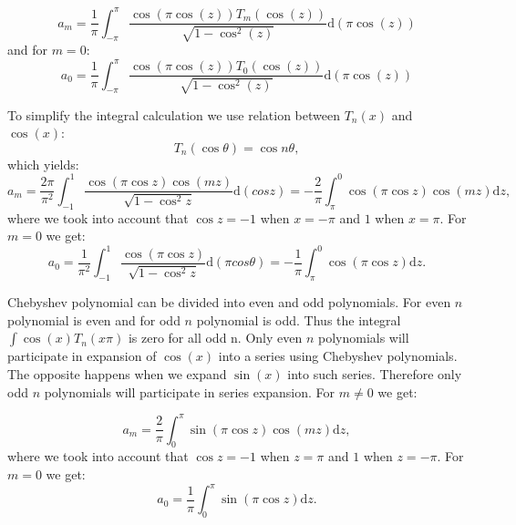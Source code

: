 \documentclass[openany, longbibliography,slovene,a4paper,12pt]{article}
\newcommand{\dif}{\mathrm{d}}
\begin{document}
\begin{equation} \label{coeffm}
a_m= \frac{1}{\pi}\int_{-\pi}^{\pi}\frac{\cos(\pi\cos(z))T_m(\cos(z))}{\sqrt{1-\cos^2(z)}} \dif(\pi\cos(z)) 
\end{equation}
and for $m=0$:
\begin{equation}\label{coeff0}
  a_0=\frac{1}{\pi}\int_{-\pi}^{\pi}\frac{\cos(\pi\cos(z))T_0(\cos(z))}{\sqrt{1-\cos^2(z)}} \dif(\pi\cos(z))
\end{equation}

To simplify the integral calculation we use relation between $T_n(x)$ and $\cos(x)$:
\begin{equation}
  T_n(\cos\theta)=\cos n\theta,
\end{equation}
which yields:
\begin{equation}
  a_m = \frac{2\pi}{\pi^2} \int_{-1}^{1}\frac{\cos(\pi\cos z)\cos(mz)}{\sqrt{1-\cos^2z}} \dif ( cosz)=-\frac{2}{\pi} \int_{\pi}^{0}\cos(\pi\cos z)\cos(mz) \dif z, 
  \end{equation}
where we took into account that $\cos z = -1$ when $x=-\pi$ and $1$ when $x=\pi$.
  For $m=0$ we get:
  \begin{equation}
    a_0 = \frac{1}{\pi^2} \int_{-1}^{1}\frac{\cos(\pi\cos z)}{\sqrt{1-\cos^2z}} \dif (\pi cos\theta)=-\frac{1}{\pi} \int_{\pi}^{0}\cos(\pi\cos z) \dif z.
  \end{equation}

  Chebyshev polynomial can be divided into even and odd polynomials. For even
  $n$ polynomial is even and for odd $n$ polynomial is odd. Thus the integral
  $\int \cos(x) T_n(x\pi)$ is zero for all odd n. Only even $n$ polynomials
  will participate in expansion of $\cos(x)$ into a series using Chebyshev
  polynomials.
  The opposite happens when we expand $\sin(x)$ into such series. Therefore only odd
  $n$ polynomials will participate in series expansion. For $m\neq0$ we get:

\begin{equation}
  a_m = \frac{2}{\pi} \int_{0}^{\pi}\sin(\pi\cos z)\cos(mz) \dif z, 
  \end{equation}
where we took into account that $\cos z = -1$ when $z=\pi$ and $1$ when $z=-\pi$.
  For $m=0$ we get:
  \begin{equation}
    a_0 = \frac{1}{\pi} \int_{0}^{\pi}\sin(\pi\cos z) \dif z.
  \end{equation}
\end{document}
